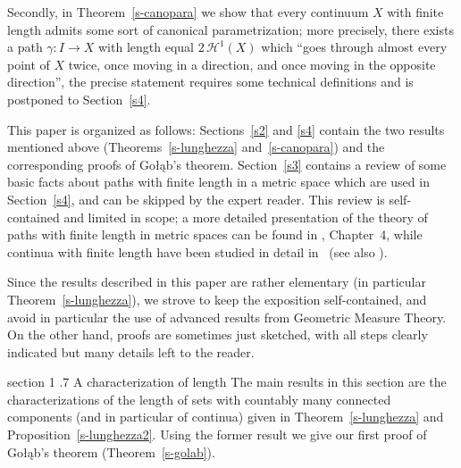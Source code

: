 \documentclass[11pt,reqno,a4paper,final]{amsart}
\makeatletter
\numberwithin{equation}{section}
\theoremstyle{mytheorem}
\theoremstyle{myremark}
\theoremstyle{myparagraph}
\def\section{\@startsection%
{section}%
{1}%
\z@{1.5\linespacing\@plus .2\linespacing}%
  {.7\linespacing}%
  {\normalfont\sc\centering}}%
\newcommand{\Haus}{\mathscr{H}}
\newcommand{\Golab}{Go{\l}\k{a}b}
\makeatother
\begin{document}
Secondly, in Theorem~\ref{s-canopara} we show that every continuum $X$ with 
finite length admits some sort of canonical parametrization; 
more precisely, there exists a path $\gamma:I\to X$ 
with length equal $2\,\Haus^1(X)$ which ``goes through  
almost every point of $X$ twice, once moving in a direction, 
and once moving in the opposite direction'',
the precise statement requires some technical definitions 
and is postponed to Section~\ref{s4}. 

\medskip
This paper is organized as follows: 
Sections~\ref{s2} and \ref{s4} 
contain the two results mentioned above
(Theorems~\ref{s-lunghezza} and~\ref{s-canopara}) 
and the corresponding proofs of \Golab's theorem.
Section~\ref{s3} contains a review of some basic facts about paths 
with finite length in a metric space which are used in Section~\ref{s4}, 
and can be skipped by the expert reader. 
This review is self-contained and limited in scope; 
a more detailed presentation of the theory of paths 
with finite length in metric spaces can be found in \cite{AT}, 
Chapter~4,  
while continua with finite length have been studied in detail in~\cite{EH} 
(see also \cite{Fre}).

Since the results described in this paper are rather 
elementary (in particular Theorem~\ref{s-lunghezza}), 
we strove to keep the exposition self-contained, 
and avoid in particular the use of advanced results 
from Geometric Measure Theory.
On the other hand, proofs are sometimes
just sketched, with all steps clearly indicated
but many details left to the reader.



\section{A characterization of length}
\label{s2}
The main results in this section are the characterizations of the length 
of sets with countably many connected components (and in particular 
of continua) given in Theorem~\ref{s-lunghezza} and Proposition~\ref{s-lunghezza2}.
Using the former result we give our first proof of \Golab's theorem
(Theorem~\ref{s-golab}).
\end{document}
